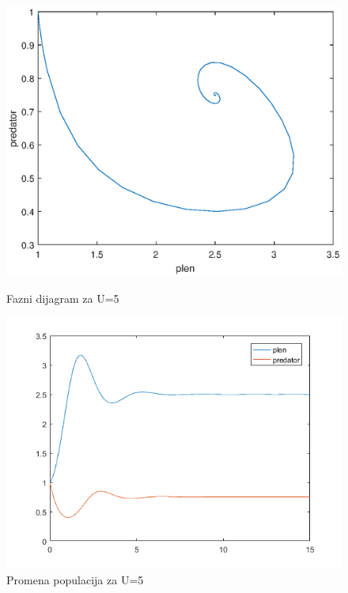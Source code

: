 \documentclass[a4paper]{article}
\begin{document}
\begin{figure}[H]
    \centering
    \begin{minipage}{0.45\textwidth}
        \centering
        \includegraphics[width=1\textwidth]{images/lotka_voltera_logistic_phase} %
        \caption{Fazni dijagram za U=5}
    \end{minipage}\hfill
    \begin{minipage}{0.45\textwidth}
        \centering
        \includegraphics[width=1\textwidth]{images/lotka_voltera_logistic_time_plot} %
        \caption{Promena populacija za U=5}
    \end{minipage}
\end{figure}
\end{document}
